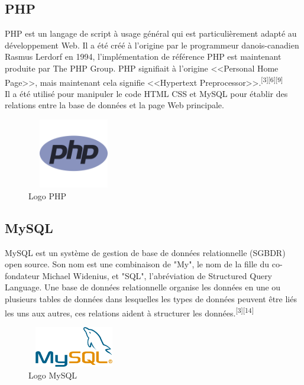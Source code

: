 \documentclass[12pt]{report}
\begin{document}
\vspace*{-0.3in}

\subsection{PHP}

PHP est un langage de script à usage général qui est particulièrement adapté au développement Web. Il a été créé à l'origine par le programmeur danois-canadien Rasmus Lerdorf en 1994, l'implémentation de référence PHP est maintenant produite par The PHP Group. PHP signifiait à l'origine <<Personal Home Page>>, mais maintenant cela signifie <<Hypertext Preprocessor>>.\textsuperscript{[3][6][9]}
\\
Il a été utilisé pour manipuler le code HTML CSS et MySQL pour établir des relations entre la base de données et la page Web principale.

\vspace{-0.1in}

\begin{figure}[h]
\centering
    \includegraphics[width = 1.6in, height = 1.2in]{../Images/PHP.png}
\vspace{-0.3in}
\caption{Logo PHP}
\end{figure}

\newpage

\subsection{MySQL}

MySQL est un système de gestion de base de données relationnelle (SGBDR) open source. Son nom est une combinaison de "My", le nom de la fille du co-fondateur Michael Widenius, et "SQL", l'abréviation de Structured Query Language. Une base de données relationnelle organise les données en une ou plusieurs tables de données dans lesquelles les types de données peuvent être liés les uns aux autres, ces relations aident à structurer les données.\textsuperscript{[3][14]}

\begin{figure}[h]
\centering
    \includegraphics[width = 1.6in, height = 0.7in]{../Images/MySQL.png}
\vspace{0.1in}
\caption{Logo MySQL}
\end{figure}
\end{document}
